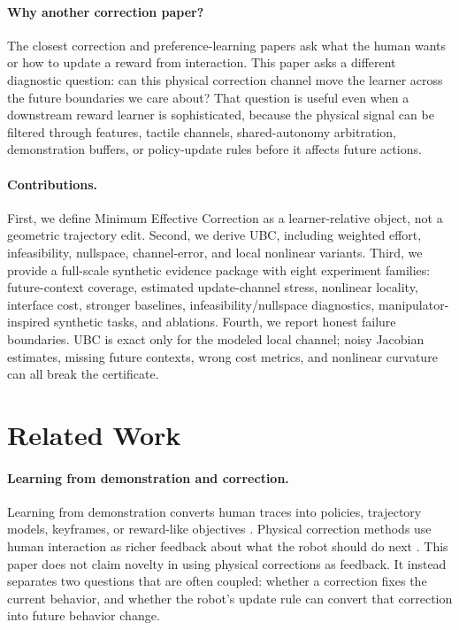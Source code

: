 \documentclass{article}
\begin{document}
\paragraph{Why another correction paper?}
The closest correction and preference-learning papers ask what the human wants
or how to update a reward from interaction. This paper asks a different
diagnostic question: can this physical correction channel move the learner
across the future boundaries we care about? That question is useful even when a
downstream reward learner is sophisticated, because the physical signal can be
filtered through features, tactile channels, shared-autonomy arbitration,
demonstration buffers, or policy-update rules before it affects future actions.

\paragraph{Contributions.}
First, we define Minimum Effective Correction as a learner-relative object, not a
geometric trajectory edit. Second, we derive UBC, including weighted effort,
infeasibility, nullspace, channel-error, and local nonlinear variants. Third, we
provide a full-scale synthetic evidence package with eight experiment families:
future-context coverage, estimated update-channel stress, nonlinear locality,
interface cost, stronger baselines, infeasibility/nullspace diagnostics,
manipulator-inspired synthetic tasks, and ablations. Fourth, we report honest
failure boundaries. UBC is exact only for the modeled local channel; noisy
Jacobian estimates, missing future contexts, wrong cost metrics, and nonlinear
curvature can all break the certificate.

\section{Related Work}

\paragraph{Learning from demonstration and correction.}
Learning from demonstration converts human traces into policies, trajectory
models, keyframes, or reward-like objectives
\citep{argall2009survey,akgun2012keyframe,chernova2014robot}. Physical
correction methods use human interaction as richer feedback about what the robot
should do next \citep{bajcsy2017learning,bajcsy2018learning,bobu2020feature}.
This paper does not claim novelty in using physical corrections as feedback. It
instead separates two questions that are often coupled: whether a correction
fixes the current behavior, and whether the robot's update rule can convert that
correction into future behavior change.
\end{document}
